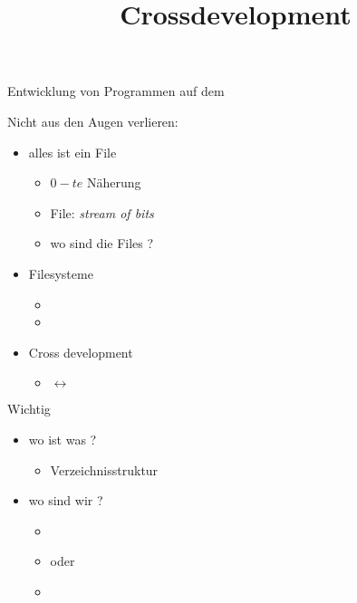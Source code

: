 \documentclass{beamer}
\title[Crossdevelopment]{Crossdevelopment}
\begin{document}
\frame{\titlepage}

\begin{frame}{Entwicklung von Programmen auf dem \target}
 \begin{block}{Nicht aus den Augen verlieren:}
 \begin{itemize}
  \item alles ist ein File 
  \begin{itemize}
   \item $0-te$ Näherung
   \item File: {\em stream of bits}
   \item wo sind die Files ?
  \end{itemize}
  \item Filesysteme
  \begin{itemize}
   \item {}
   \item {}
  \end{itemize}
  \item Cross development
  \begin{itemize}
   \item \host $\leftrightarrow$ \target
  \end{itemize}
 \end{itemize}
 \end{block}
\end{frame}

\begin{frame}{Wichtig}
 \begin{itemize}
  \item wo ist was ?
  \begin{itemize}
  \item {\Large Verzeichnisstruktur}
  \end{itemize}
  \item wo sind wir ?
  \begin{itemize}
   \item \host
   \item[] oder
   \item \target
  \end{itemize}
 \end{itemize}
\end{frame}
\end{document}

